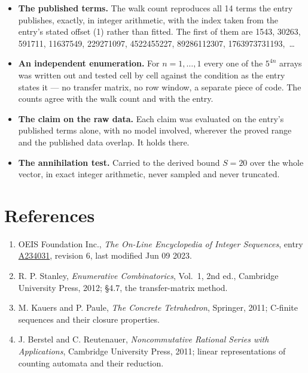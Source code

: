 \documentclass[11pt]{article}
\theoremstyle{definition}
\begin{document}
\begin{itemize}

\item {\bfseries The published terms.} The walk count reproduces all 14 terms the entry publishes, exactly, in integer arithmetic, with the index taken from the entry's stated offset (1) rather than fitted. The first of them are 1543, 30263, 591711, 11637549, 229271097, 4522455227, 89286112307, 1763973731193,~\dots

\item {\bfseries An independent enumeration.} For $n = 1,\dots,1$ every one of the $5^{4n}$ arrays was written out and tested cell by cell against the condition as the entry states it --- no transfer matrix, no row window, a separate piece of code. The counts agree with the walk count and with the entry.

\item {\bfseries The claim on the raw data.} Each claim was evaluated on the entry's published terms alone, with no model involved, wherever the proved range and the published data overlap. It holds there.

\item {\bfseries The annihilation test.} Carried to the derived bound $S = 20$ over the whole vector, in exact integer arithmetic, never sampled and never truncated.

\end{itemize}

\section{References}

\begin{enumerate}

\item OEIS Foundation Inc., \emph{The On-Line Encyclopedia of Integer Sequences}, entry \href{https://oeis.org/A234031}{A234031}, revision 6, last modified Jun 09 2023.

\item R. P. Stanley, \emph{Enumerative Combinatorics}, Vol.~1, 2nd ed., Cambridge University Press, 2012; \S4.7, the transfer-matrix method.

\item M. Kauers and P. Paule, \emph{The Concrete Tetrahedron}, Springer, 2011; C-finite sequences and their closure properties.

\item J. Berstel and C. Reutenauer, \emph{Noncommutative Rational Series with Applications}, Cambridge University Press, 2011; linear representations of counting automata and their reduction.

\end{enumerate}
\end{document}
